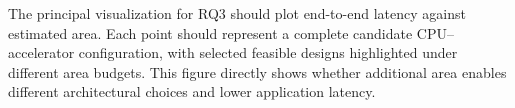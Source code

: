 The principal visualization for RQ3 should plot end-to-end latency against estimated area. Each point should represent a complete candidate CPU--accelerator configuration, with selected feasible designs highlighted under different area budgets. This figure directly shows whether additional area enables different architectural choices and lower application latency.



